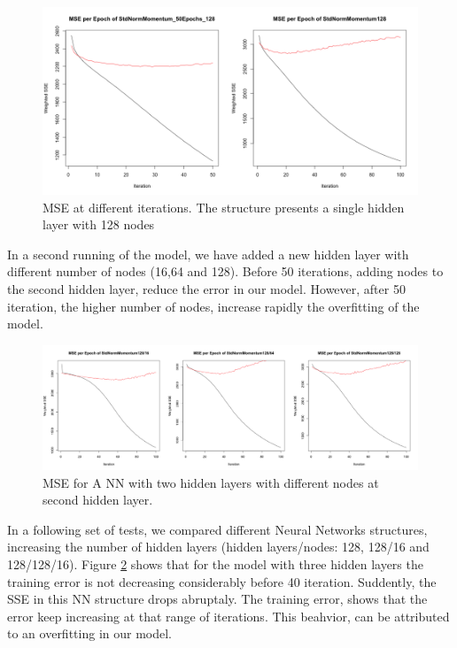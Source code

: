 \documentclass[11.5pt]{article}
\newcounter{Figure}
\newcounter{graphics}
\begin{document}
\begin{figure}[h!]
 \includegraphics[width=1\textwidth]{report_mlp/50_100_128.png}
  \caption{MSE at different iterations. The structure presents a single hidden layer with 128 nodes}
  \label{50_100_128.png}
\end{figure}


In a second running of the model, we have added a new hidden layer  with different number of nodes (16,64 and 128). Before 50 iterations, adding nodes to the second hidden layer, reduce the error in our model. However, after 50 iteration, the higher number of nodes, increase rapidly the overfitting  of the model. \par 


\begin{figure}[h!]
\includegraphics[width=1\textwidth]{report_mlp/128-16_64_128.png}
  \caption{MSE for A NN with two hidden layers with different nodes at second hidden layer.}
\label{128-16_64_128.png}
\end{figure}

In  a following set of tests, we compared different Neural Networks structures, increasing the number of hidden layers (hidden layers/nodes: 128, 128/16 and 128/128/16).  Figure \ref{128-16_64_128.png} shows that for the model with three hidden layers the training error is not decreasing considerably before 40 iteration. Suddently, the SSE in this NN structure drops abruptaly. The training error, shows that the error keep increasing at that range of iterations. This beahvior, can be attributed to an overfitting in our model. \par
\end{document}
